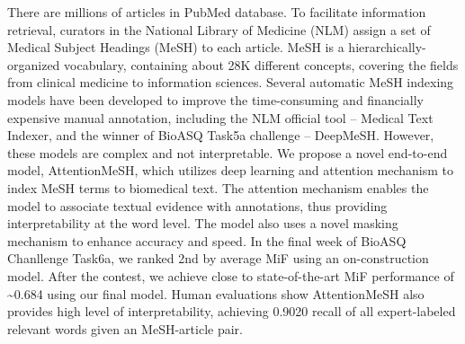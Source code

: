 There are millions of articles in PubMed database. To facilitate information retrieval, curators in the National Library of Medicine (NLM) assign a set of Medical Subject Headings (MeSH) to each article. MeSH is a hierarchically-organized vocabulary, containing about 28K different concepts, covering the fields from clinical medicine to information sciences. Several automatic MeSH indexing models have been developed to improve the time-consuming and financially expensive manual annotation, including the NLM official tool -- Medical Text Indexer, and the winner of BioASQ Task5a challenge -- DeepMeSH. However, these models are complex and not interpretable. We propose a novel end-to-end model, AttentionMeSH, which utilizes deep learning and attention mechanism to index MeSH terms to biomedical text. The attention mechanism enables the model to associate textual evidence with annotations, thus providing interpretability at the word level. The model also uses a novel masking mechanism to enhance accuracy and speed. In the final week of BioASQ Chanllenge Task6a, we ranked 2nd by average MiF using an on-construction model. After the contest, we achieve close to state-of-the-art MiF performance of {\textasciitilde}0.684 using our final model. Human evaluations show AttentionMeSH also provides high level of interpretability, achieving 0.90\@20 recall of all expert-labeled relevant words given an MeSH-article pair.
